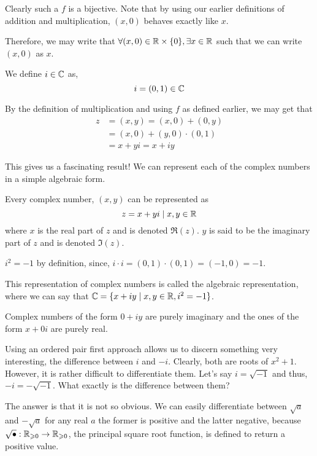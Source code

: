 Clearly such a \(f\) is a bijective. Note that by using our earlier definitions
of addition and multiplication, \((x, 0)\) behaves exactly like \(x\).

Therefore, we may write that \(\forall (x, 0) \in \mathbb R \times \{0\}, \exists x \in \mathbb R\) such that we
can write \((x,0)\) as \(x\).

\begin{definition}
    We define \(i \in \mathbb C\) as, 
    \[i = (0, 1) \in \mathbb C\]
\end{definition}

By the definition of multiplication and using \(f\) as defined earlier, we may get that
\begin{align*}
    z &= (x, y) = (x, 0) + (0, y)  \\ 
    &= (x, 0) + (y, 0) \cdot (0,1) \\
    &= x + yi = x + iy
\end{align*}

This gives us a fascinating result! We can represent each of the complex numbers in a simple
algebraic form.

\begin{lemma}
    Every complex number, \((x, y)\) can be represented as 
    \[
        z = x + yi \mid x, y \in \mathbb R\]
    where \(x\) is the real part of \(z\) and is denoted \(\Re(z)\). \(y\) is said
    to be the imaginary part of \(z\) and is denoted \(\Im(z)\).
\end{lemma}

\(i^2 = -1\) by definition, since, \(i \cdot i = (0,1) \cdot (0,1) = (-1,0) = -1\).

This representation of complex numbers is called the algebraic representation, where we can
say that \(\mathbb C = \{x + iy \mid x, y \in \mathbb R, i^2 = -1\}\). 

Complex numbers of the form \(0 + iy\) are purely imaginary and the ones of the form \(x + 0i\)
are purely real. 

Using an ordered pair first approach allows us to discern something very interesting, the difference
between \(i\) and \(-i\). Clearly, both are roots of \(x^2 + 1\). However, it is rather
difficult to differentiate them. Let's say \(i = \sqrt{-1}\) and thus, \(-i = -\sqrt{-1}\).
What exactly is the difference between them?

The answer is that it is not so obvious. We can easily differentiate between 
\(\sqrt{a}\) and \(-\sqrt{a}\) for any real \(a\) the former is positive and the latter
negative, because \(\sqrt{\bullet} : \mathbb R_{\geqslant 0} \to \mathbb R_{\geqslant 0} \), the principal square root function,
is defined to return a positive value. 

